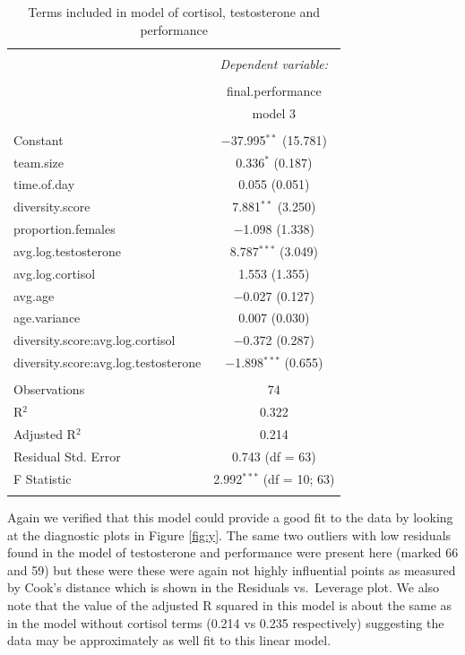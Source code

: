 \documentclass[]{article}
\begin{document}
\begin{table}[!htbp] \centering 
  \caption{Terms included in model of cortisol, testosterone and performance} 
  \label{tab:regression} 
\small 
\begin{tabular}{@{\extracolsep{1pt}}lc} 
\\[-1.8ex]\hline 
\hline \\[-1.8ex] 
 & \multicolumn{1}{c}{\textit{Dependent variable:}} \\ 
\cline{2-2} 
\\[-1.8ex] & final.performance \\ 
 & model 3 \\ 
\hline \\[-1.8ex] 
 Constant & $-$37.995$^{**}$ (15.781) \\ 
  team.size & 0.336$^{*}$ (0.187) \\ 
  time.of.day & 0.055 (0.051) \\ 
  diversity.score & 7.881$^{**}$ (3.250) \\ 
  proportion.females & $-$1.098 (1.338) \\ 
  avg.log.testosterone & 8.787$^{***}$ (3.049) \\ 
  avg.log.cortisol & 1.553 (1.355) \\ 
  avg.age & $-$0.027 (0.127) \\ 
  age.variance & 0.007 (0.030) \\ 
  diversity.score:avg.log.cortisol & $-$0.372 (0.287) \\ 
  diversity.score:avg.log.testosterone & $-$1.898$^{***}$ (0.655) \\ 
 \hline \\[-1.8ex] 
Observations & 74 \\ 
R$^{2}$ & 0.322 \\ 
Adjusted R$^{2}$ & 0.214 \\ 
Residual Std. Error & 0.743 (df = 63) \\ 
F Statistic & 2.992$^{***}$ (df = 10; 63) \\ 
\hline 
\hline \\[-1.8ex] 
\end{tabular} 
\end{table}

Again we verified that this model could provide a good fit to the data
by looking at the diagnostic plots in Figure \ref{fig:y}. The same two
outliers with low residuals found in the model of testosterone and
performance were present here (marked 66 and 59) but these were these
were again not highly influential points as measured by Cook's distance
which is shown in the Residuals vs.~Leverage plot. We also note that the
value of the adjusted R squared in this model is about the same as in
the model without cortisol terms (0.214 vs 0.235 respectively)
suggesting the data may be approximately as well fit to this linear
model.
\end{document}

